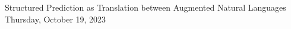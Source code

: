


\def\name{}
\def\netid{}




   {Structured Prediction as Translation between Augmented Natural Languages}
   {Thursday, October 19, 2023}








